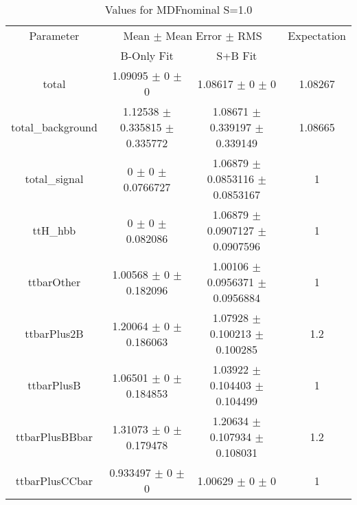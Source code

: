 \begin{table}
\centering
\caption{Values for MDFnominal S=1.0}
\begin{tabular}{cccc}
\toprule
Parameter & \multicolumn{2}{c}{Mean $\pm$ Mean Error $\pm$ RMS} & Expectation\\
 & B-Only Fit & S+B Fit & \\
\midrule
total & \num{1.09095} $\pm$ \num{0} $\pm$ \num{0} & \num{1.08617} $\pm$ \num{0} $\pm$ \num{0} & \num{1.08267}\\
total\_background & \num{1.12538} $\pm$ \num{0.335815} $\pm$ \num{0.335772} & \num{1.08671} $\pm$ \num{0.339197} $\pm$ \num{0.339149} & \num{1.08665}\\
total\_signal & \num{0} $\pm$ \num{0} $\pm$ \num{0.0766727} & \num{1.06879} $\pm$ \num{0.0853116} $\pm$ \num{0.0853167} & \num{1}\\
ttH\_hbb & \num{0} $\pm$ \num{0} $\pm$ \num{0.082086} & \num{1.06879} $\pm$ \num{0.0907127} $\pm$ \num{0.0907596} & \num{1}\\
ttbarOther & \num{1.00568} $\pm$ \num{0} $\pm$ \num{0.182096} & \num{1.00106} $\pm$ \num{0.0956371} $\pm$ \num{0.0956884} & \num{1}\\
ttbarPlus2B & \num{1.20064} $\pm$ \num{0} $\pm$ \num{0.186063} & \num{1.07928} $\pm$ \num{0.100213} $\pm$ \num{0.100285} & \num{1.2}\\
ttbarPlusB & \num{1.06501} $\pm$ \num{0} $\pm$ \num{0.184853} & \num{1.03922} $\pm$ \num{0.104403} $\pm$ \num{0.104499} & \num{1}\\
ttbarPlusBBbar & \num{1.31073} $\pm$ \num{0} $\pm$ \num{0.179478} & \num{1.20634} $\pm$ \num{0.107934} $\pm$ \num{0.108031} & \num{1.2}\\
ttbarPlusCCbar & \num{0.933497} $\pm$ \num{0} $\pm$ \num{0} & \num{1.00629} $\pm$ \num{0} $\pm$ \num{0} & \num{1}\\
\bottomrule
\end{tabular}
\end{table}